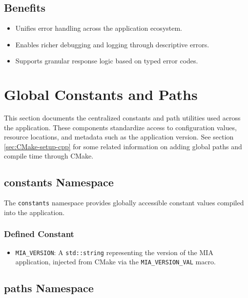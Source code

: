 \subsection*{Benefits}
\begin{itemize}\itemsep0em
	\item Unifies error handling across the application ecosystem.
	\item Enables richer debugging and logging through descriptive errors.
	\item Supports granular response logic based on typed error codes.
\end{itemize}








\section{Global Constants and Paths}
\label{sec:global-constants-and-paths}

This section documents the centralized constants and path utilities used across the application. These components standardize access to configuration values, resource locations, and metadata such as the application version. See section \ref{sec:CMake-setup-cpp} for some related information on adding global paths and compile time through CMake.

\subsection{constants Namespace}

The \texttt{constants} namespace provides globally accessible constant values compiled into the application.

\subsubsection*{Defined Constant}
\begin{itemize}\itemsep0em
	\item \texttt{MIA\_VERSION}: A \texttt{std::string} representing the version of the MIA application, injected from CMake via the \texttt{MIA\_VERSION\_VAL} macro.
\end{itemize}

\subsection{paths Namespace}

